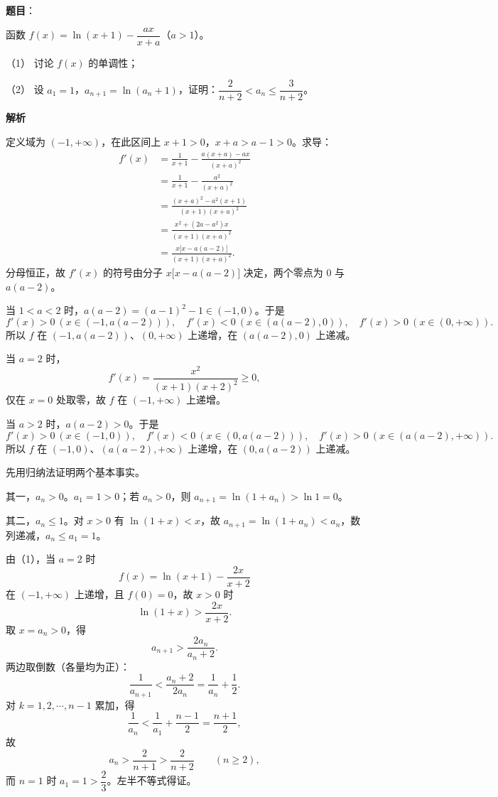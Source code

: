 \begin{answer}

\textbf{题目}：

函数 $f(x)=\ln(x+1)-\dfrac{ax}{x+a}$（$a>1$）。

（1） 讨论 $f(x)$ 的单调性；

（2） 设 $a_1=1$，$a_{n+1}=\ln(a_n+1)$，证明：$\dfrac{2}{n+2}<a_n\leqslant\dfrac{3}{n+2}$。

\textbf{解析}


定义域为 $(-1,+\infty)$，在此区间上 $x+1>0$，$x+a>a-1>0$。求导：
\nopagebreak[4]
\[\begin{aligned}
f'(x)&=\frac{1}{x+1}-\frac{a(x+a)-ax}{(x+a)^2}\\
&=\frac{1}{x+1}-\frac{a^2}{(x+a)^2}\\
&=\frac{(x+a)^2-a^2(x+1)}{(x+1)(x+a)^2}\\
&=\frac{x^2+(2a-a^2)x}{(x+1)(x+a)^2}\\
&=\frac{x\bigl[x-a(a-2)\bigr]}{(x+1)(x+a)^2}.
\end{aligned}\]
分母恒正，故 $f'(x)$ 的符号由分子 $x\bigl[x-a(a-2)\bigr]$ 决定，两个零点为 $0$ 与 $a(a-2)$。

当 $1<a<2$ 时，$a(a-2)=(a-1)^2-1\in(-1,0)$。于是
\nopagebreak[4]
\[f'(x)>0\ (x\in(-1,a(a-2))),\quad
f'(x)<0\ (x\in(a(a-2),0)),\quad
f'(x)>0\ (x\in(0,+\infty)).\]
所以 $f$ 在 $(-1,a(a-2))$、$(0,+\infty)$ 上递增，在 $(a(a-2),0)$ 上递减。

当 $a=2$ 时，
\nopagebreak[4]
\[f'(x)=\frac{x^2}{(x+1)(x+2)^2}\geqslant0,\]
仅在 $x=0$ 处取零，故 $f$ 在 $(-1,+\infty)$ 上递增。

当 $a>2$ 时，$a(a-2)>0$。于是
\nopagebreak[4]
\[f'(x)>0\ (x\in(-1,0)),\quad
f'(x)<0\ (x\in(0,a(a-2))),\quad
f'(x)>0\ (x\in(a(a-2),+\infty)).\]
所以 $f$ 在 $(-1,0)$、$(a(a-2),+\infty)$ 上递增，在 $(0,a(a-2))$ 上递减。


先用归纳法证明两个基本事实。

其一，$a_n>0$。$a_1=1>0$；若 $a_n>0$，则 $a_{n+1}=\ln(1+a_n)>\ln1=0$。

其二，$a_n\leqslant1$。对 $x>0$ 有 $\ln(1+x)<x$，故 $a_{n+1}=\ln(1+a_n)<a_n$，数列递减，$a_n\leqslant a_1=1$。

由（1），当 $a=2$ 时
\nopagebreak[4]
\[f(x)=\ln(x+1)-\frac{2x}{x+2}\]
在 $(-1,+\infty)$ 上递增，且 $f(0)=0$，故 $x>0$ 时
\nopagebreak[4]
\[\ln(1+x)>\frac{2x}{x+2}.\]
取 $x=a_n>0$，得
\nopagebreak[4]
\[a_{n+1}>\frac{2a_n}{a_n+2}.\]
两边取倒数（各量均为正）：
\nopagebreak[4]
\[\frac{1}{a_{n+1}}<\frac{a_n+2}{2a_n}=\frac{1}{a_n}+\frac12.\]
对 $k=1,2,\cdots,n-1$ 累加，得
\nopagebreak[4]
\[\frac{1}{a_n}<\frac{1}{a_1}+\frac{n-1}{2}=\frac{n+1}{2},\]
故
\nopagebreak[4]
\[a_n>\frac{2}{n+1}>\frac{2}{n+2}\qquad(n\geqslant2),\]
而 $n=1$ 时 $a_1=1>\dfrac23$。左半不等式得证。


\end{answer}
